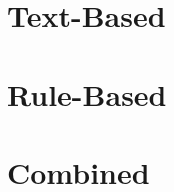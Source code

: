 \section{Text-Based}
\label{sec:2_related_work/1_text_based}



\section{Rule-Based}
\label{sec:2_related_work/2_rule_based}



\section{Combined}
\label{sec:2_related_work/3_combined}

